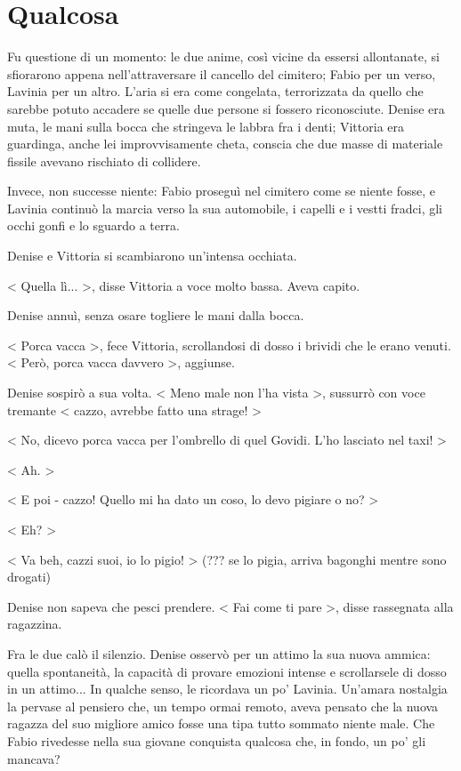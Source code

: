 \chapter{Qualcosa}

Fu questione di un momento: le due anime, così vicine da essersi allontanate, si sfiorarono appena nell'attraversare il cancello del cimitero; Fabio per un verso, Lavinia per un altro. L'aria si era come congelata, terrorizzata da quello che sarebbe potuto accadere se quelle due persone si fossero riconosciute. Denise era muta, le mani sulla bocca che stringeva le labbra fra i denti; Vittoria era guardinga, anche lei improvvisamente cheta, conscia che due masse di materiale fissile avevano rischiato di collidere.

Invece, non successe niente: Fabio proseguì nel cimitero come se niente fosse, e Lavinia continuò la marcia verso la sua automobile, i capelli e i vestti fradci, gli occhi gonfi e lo sguardo a terra.

Denise e Vittoria si scambiarono un'intensa occhiata.

< Quella lì... >, disse Vittoria a voce molto bassa. Aveva capito.

Denise annuì, senza osare togliere le mani dalla bocca.

< Porca vacca >, fece Vittoria, scrollandosi di dosso i brividi che le erano venuti. < Però, porca vacca davvero >, aggiunse.

Denise sospirò a sua volta. < Meno male non l'ha vista >, sussurrò con voce tremante < cazzo, avrebbe fatto una strage! >

< No, dicevo porca vacca per l'ombrello di quel Govidi. L'ho lasciato nel taxi! >

< Ah. >

< E poi - cazzo! Quello mi ha dato un coso, lo devo pigiare o no? > 

< Eh? >

< Va beh, cazzi suoi, io lo pigio! > (??? se lo pigia, arriva bagonghi mentre sono drogati)

Denise non sapeva che pesci prendere. < Fai come ti pare >, disse rassegnata alla ragazzina.

Fra le due calò il silenzio. Denise osservò per un attimo la sua nuova ammica: quella spontaneità, la capacità di provare emozioni intense e scrollarsele di dosso in un attimo... In qualche senso, le ricordava un po' Lavinia. Un'amara nostalgia la pervase al pensiero che, un tempo ormai remoto, aveva pensato che la nuova ragazza del suo migliore amico fosse una tipa tutto sommato niente male. Che Fabio rivedesse nella sua giovane conquista qualcosa che, in fondo, un po' gli mancava?

